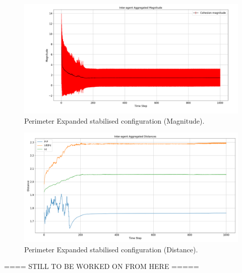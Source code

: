 \documentclass[12pt,a4paper]{IEEEtran}
\begin{document}
\begin{figure}[H]
	\begin{center}
		\includegraphics[width=1.0\linewidth]{figures/perimExpandMagnitude}
	\end{center}
	\caption{Perimeter Expanded stabilised configuration (Magnitude). \label{fig:perimExpandMagnitude}}
\end{figure}

\begin{figure}[H]
	\begin{center}
		\includegraphics[width=1.0\linewidth]{figures/perimExpandDistance}
	\end{center}
	\caption{Perimeter Expanded stabilised configuration (Distance). \label{fig:perimExpandDistance}}
\end{figure}


==== STILL TO BE WORKED ON FROM HERE =====\\

\end{document}
